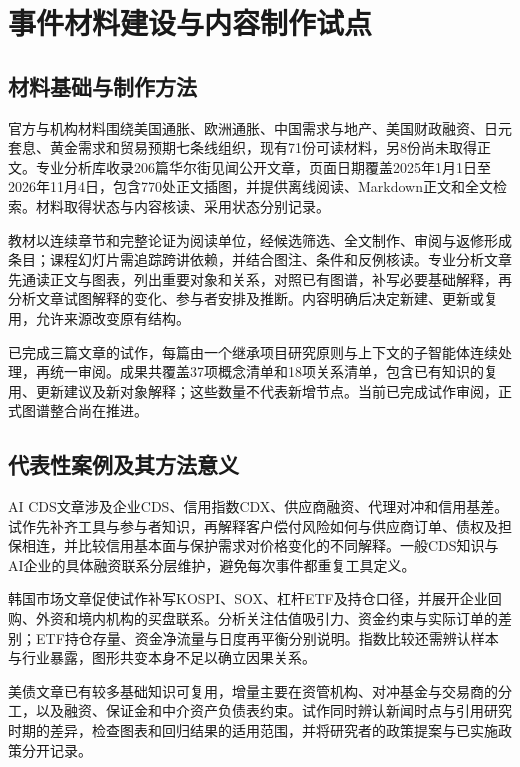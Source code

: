 \documentclass[11pt,letterpaper]{article}
\begin{document}
\newpage
\section{事件材料建设与内容制作试点}

\subsection{材料基础与制作方法}

官方与机构材料围绕美国通胀、欧洲通胀、中国需求与地产、美国财政融资、日元套息、黄金需求和贸易预期七条线组织，现有71份可读材料，另8份尚未取得正文。专业分析库收录206篇华尔街见闻公开文章，页面日期覆盖2025年1月1日至2026年11月4日，包含770处正文插图，并提供离线阅读、Markdown正文和全文检索。材料取得状态与内容核读、采用状态分别记录。

教材以连续章节和完整论证为阅读单位，经候选筛选、全文制作、审阅与返修形成条目；课程幻灯片需追踪跨讲依赖，并结合图注、条件和反例核读。专业分析文章先通读正文与图表，列出重要对象和关系，对照已有图谱，补写必要基础解释，再分析文章试图解释的变化、参与者安排及推断。内容明确后决定新建、更新或复用，允许来源改变原有结构。

已完成三篇文章的试作，每篇由一个继承项目研究原则与上下文的子智能体连续处理，再统一审阅。成果共覆盖37项概念清单和18项关系清单，包含已有知识的复用、更新建议及新对象解释；这些数量不代表新增节点。当前已完成试作审阅，正式图谱整合尚在推进。

\subsection{代表性案例及其方法意义}

AI CDS文章\cite{aicds}涉及企业CDS、信用指数CDX、供应商融资、代理对冲和信用基差。试作先补齐工具与参与者知识，再解释客户偿付风险如何与供应商订单、债权及担保相连，并比较信用基本面与保护需求对价格变化的不同解释。一般CDS知识与AI企业的具体融资联系分层维护，避免每次事件都重复工具定义。

韩国市场文章\cite{korea}促使试作补写KOSPI、SOX、杠杆ETF及持仓口径，并展开企业回购、外资和境内机构的买盘联系。分析关注估值吸引力、资金约束与实际订单的差别；ETF持仓存量、资金净流量与日度再平衡分别说明。指数比较还需辨认样本与行业暴露，图形共变本身不足以确立因果关系。

美债文章\cite{basis}已有较多基础知识可复用，增量主要在资管机构、对冲基金与交易商的分工，以及融资、保证金和中介资产负债表约束。试作同时辨认新闻时点与引用研究时期的差异，检查图表和回归结果的适用范围，并将研究者的政策提案与已实施政策分开记录。
\end{document}
